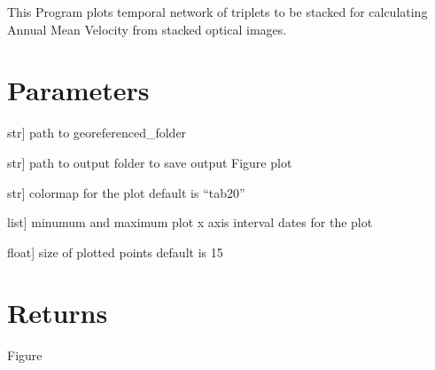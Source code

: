 \documentclass[letterpaper,10pt]{sphinxmanual}
\begin{document}
\begin{fulllineitems}
\label{\detokenize{generated/akhdefo_functions.plot_stackNetwork:akhdefo_functions.plot_stackNetwork}}
\pysigstartsignatures
{}
\pysigstopsignatures
\sphinxAtStartPar
This Program plots temporal network of triplets to be stacked for calculating 
Annual Mean Velocity from stacked optical images.


\section{Parameters}
\label{\detokenize{generated/akhdefo_functions.plot_stackNetwork:parameters}}\begin{description}
\sphinxlineitem{src\_folder}{[}str{]}
\sphinxAtStartPar
path to georeferenced\_folder

\sphinxlineitem{output\_folder}{[}str{]}
\sphinxAtStartPar
path to output folder to save output Figure plot

\sphinxlineitem{cmap}{[}str{]}
\sphinxAtStartPar
colormap for the plot default is “tab20”

\sphinxlineitem{date\_plot\_interval}{[}list{]}
\sphinxAtStartPar
minumum and maximum plot x axis interval dates for the plot

\sphinxlineitem{marker\_size}{[}float{]}
\sphinxAtStartPar
size of plotted points default is 15

\end{description}


\section{Returns}
\label{\detokenize{generated/akhdefo_functions.plot_stackNetwork:returns}}
\sphinxAtStartPar
Figure

\end{fulllineitems}


\sphinxstepscope
\end{document}
